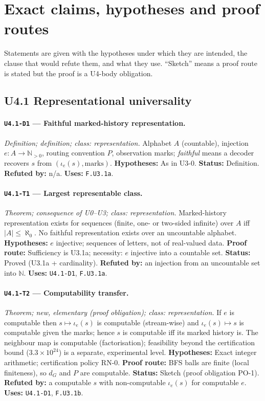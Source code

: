 \documentclass[11pt]{article}
\begin{document}
\normalsize

\section{Exact claims, hypotheses and proof routes}
Statements are given with the hypotheses under which they are intended, the clause that would refute them, and what they use. ``Sketch'' means a proof route is stated but the proof is a U4-body obligation.
\subsection{U4.1 Representational universality}
\paragraph{\texttt{U4.1-D1} --- Faithful marked-history representation.} \emph{Definition; definition; class: representation.} Alphabet $A$ (countable), injection $e:A\to\mathbb N_{>0}$, routing convention $P$, observation marks; \emph{faithful} means a decoder recovers $s$ from $(\iota_e(s),\text{marks})$. \textbf{Hypotheses:} As in U3-0. \textbf{Status:} Definition. \textbf{Refuted by:} n/a. \textbf{Uses:} \texttt{F.U3.1a}.

\paragraph{\texttt{U4.1-T1} --- Largest representable class.} \emph{Theorem; consequence of U0--U3; class: representation.} Marked-history representation exists for sequences (finite, one- or two-sided infinite) over $A$ iff $|A|\le\aleph_0$. No faithful representation exists over an uncountable alphabet. \textbf{Hypotheses:} $e$ injective; sequences of letters, not of real-valued data. \textbf{Proof route:} Sufficiency is U3.1a; necessity: $e$ injective into a countable set. \textbf{Status:} Proved (U3.1a + cardinality). \textbf{Refuted by:} an injection from an uncountable set into $\mathbb N$. \textbf{Uses:} \texttt{U4.1-D1}, \texttt{F.U3.1a}.

\paragraph{\texttt{U4.1-T2} --- Computability transfer.} \emph{Theorem; new, elementary (proof obligation); class: representation.} If $e$ is computable then $s\mapsto\iota_e(s)$ is computable (stream-wise) and $\iota_e(s)\mapsto s$ is computable given the marks; hence $s$ is computable iff its marked history is. The neighbour map is computable (factorisation); feasibility beyond the certification bound ($3.3\times10^{24}$) is a separate, experimental level. \textbf{Hypotheses:} Exact integer arithmetic; certification policy RN-0. \textbf{Proof route:} BFS balls are finite (local finiteness), so $d_G$ and $P$ are computable. \textbf{Status:} Sketch (proof obligation PO-1). \textbf{Refuted by:} a computable $s$ with non-computable $\iota_e(s)$ for computable $e$. \textbf{Uses:} \texttt{U4.1-D1}, \texttt{F.U3.1b}.
\end{document}

